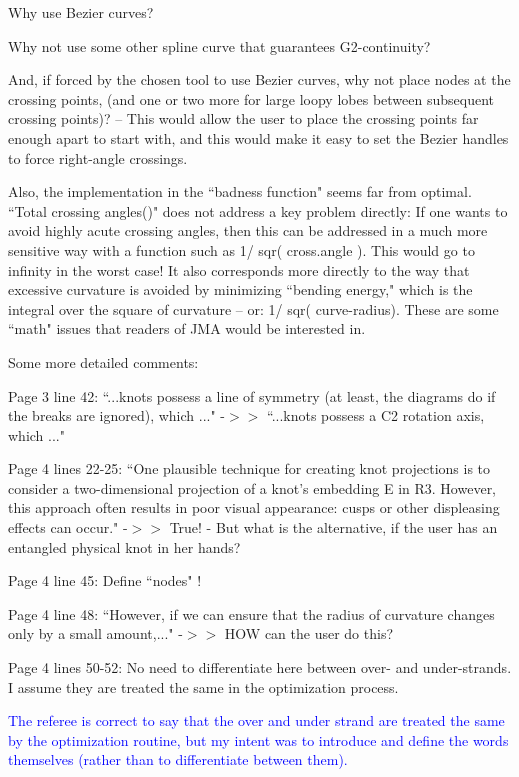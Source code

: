 \documentclass[12pt]{article}
\begin{document}
Why use Bezier curves? 

Why not use some other spline curve that guarantees G2-continuity?

And, if forced by the chosen tool to use Bezier curves, why not place
nodes at the crossing points, (and one or two more for large loopy
lobes between subsequent crossing points)?  -- This would allow the
user to place the crossing points far enough apart to start with, and
this would make it easy to set the Bezier handles to force right-angle
crossings.

Also, the implementation in the ``badness function" seems far from
optimal.  ``Total crossing angles()" does not address a key problem
directly: If one wants to avoid highly acute crossing angles, then
this can be addressed in a much more sensitive way with a function
such as 1/ sqr( cross.angle ).  This would go to infinity in the worst
case!  It also corresponds more directly to the way that excessive
curvature is avoided by minimizing ``bending energy," which is the
integral over the square of curvature -- or: 1/ sqr( curve-radius).
These are some ``math" issues that readers of JMA would be interested
in.


Some more detailed comments:

Page 3 line 42: ``...knots possess a line of symmetry (at least, the
diagrams do if the breaks are ignored), which ..."  -$>>$ ``...knots
possess a C2 rotation axis, which ..."

Page 4 lines 22-25: ``One plausible technique for creating knot
projections is to consider a two-dimensional projection of a knot's
embedding E in R3. However, this approach often results in poor visual
appearance: cusps or other displeasing effects can occur."  -$>>$ True!
- But what is the alternative, if the user has an entangled physical
knot in her hands?

Page 4 line 45: Define ``nodes" !

Page 4 line 48: ``However, if we can ensure that the radius of
curvature changes only by a small amount,..."  -$>>$ HOW can the user do
this?

Page 4 lines 50-52: No need to differentiate here between over- and
under-strands.  I assume they are treated the same in the optimization
process.

\textcolor{blue}{The referee is correct to say that the over and under
  strand are treated the same by the optimization routine, but my
  intent was to introduce and define the words themselves (rather than
  to differentiate between them).}
\end{document}
